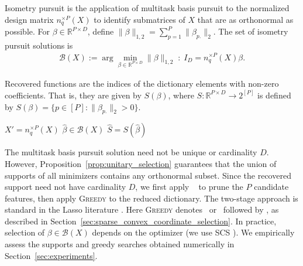 Isometry pursuit is the application of multitask basis pursuit to the normalized design matrix $n_q^{\times P}(X)$ to identify submatrices of $ X$ that are as orthonormal as possible.
For $\beta\in\mathbb R^{P\times D}$, define $\|\beta\|_{1,2}=\sum_{p=1}^P\|\beta_{p.}\|_2$.
The set of isometry pursuit solutions is
\begin{align}
\label{prog:isometry_pursuit}
\mathcal B(X):=\arg\min_{\beta\in\mathbb R^{P\times D}}\|\beta\|_{1,2}\;:\;I_D=n_q^{\times P}(X)\beta.
\end{align}

Recovered functions are the indices of the dictionary elements with non-zero coefficients.
That is, they are given by $S(\beta)$, where $S:\mathbb R^{P\times D}\to 2^{[P]}$ is defined by $S(\beta)=\{p\in[P]:\|\beta_{p.}\|_2>0\}$.
\begin{algorithm}[H]
\caption{\isometrypursuit(Matrix ${X} \in \mathbb{R}^{D \times P}$)}
\begin{algorithmic}[1]
 $X' = n_q^{\times P}(X)$
 $\widehat \beta \in \mathcal B(X)$
 $\widehat{S} = S (\widehat \beta)$
\end{algorithmic}
\end{algorithm}

The multitask basis pursuit solution need not be unique \citep{JMLR:v23:21-0420} or cardinality $D$.
However, Proposition~\ref{prop:unitary_selection} guarantees that the union of supports of all minimizers contains any orthonormal subset.
Since the recovered support need not have cardinality $D$, we first apply \isometrypursuit~ to prune the $P$ candidate features, then apply \textsc{Greedy} to the reduced dictionary.
The two-stage approach is standard in the Lasso literature \citep{Meinshausen2007-ey, Hesterberg2008-iy, Koelle2022-ju, Bruckmeier2023-cube}.
Here \textsc{Greedy} denotes \greedy~or \backwardgreedy~followed by \forwardbackward, as described in Section~\ref{sec:sparse_convex_coordinate_selection}.
In practice, selection of $\beta\in\mathcal B(X)$ depends on the optimizer (we use SCS \citep{O-Donoghue2013-wf}).
We empirically assess the supports and greedy searches obtained numerically in Section~\ref{sec:experiments}.

